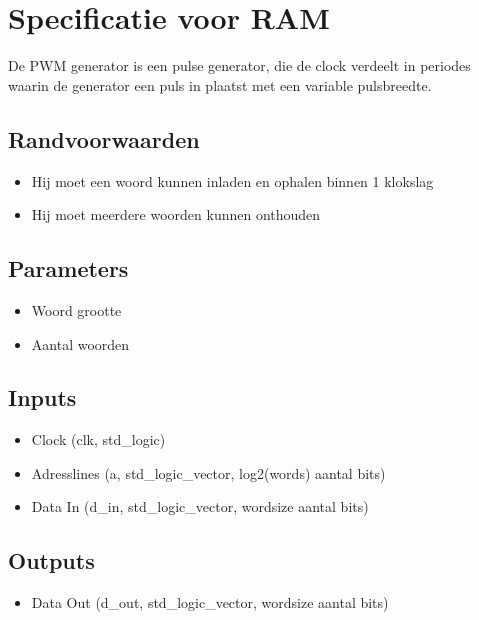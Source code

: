 \documentclass{article}
\begin{document}
\section{Specificatie voor RAM}
De PWM generator is een pulse generator, die de clock verdeelt in periodes waarin de generator een puls in plaatst met een variable pulsbreedte.
\subsection{Randvoorwaarden}
\begin{itemize}
\item Hij moet een woord kunnen inladen en ophalen binnen 1 klokslag
\item Hij moet meerdere woorden kunnen onthouden
\end{itemize}
\subsection{Parameters}
\begin{itemize}
\item Woord grootte
\item Aantal woorden

\end{itemize}
\subsection{Inputs}
\begin{itemize}
\item Clock (clk, std\_logic)
\item Adresslines (a, std\_logic\_vector, log2(words) aantal bits)
\item Data In (d\_in, std\_logic\_vector, wordsize aantal bits)
\end{itemize}
\subsection{Outputs}
\begin{itemize}
\item Data Out (d\_out, std\_logic\_vector, wordsize aantal bits)
\end{itemize}
\end{document}
